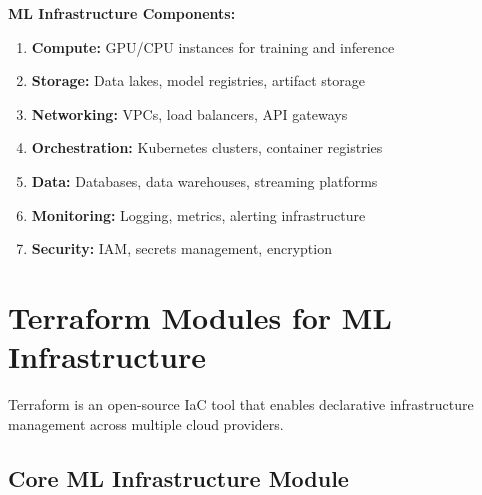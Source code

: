 \textbf{ML Infrastructure Components:}

\begin{enumerate}
    \item \textbf{Compute:} GPU/CPU instances for training and inference
    \item \textbf{Storage:} Data lakes, model registries, artifact storage
    \item \textbf{Networking:} VPCs, load balancers, API gateways
    \item \textbf{Orchestration:} Kubernetes clusters, container registries
    \item \textbf{Data:} Databases, data warehouses, streaming platforms
    \item \textbf{Monitoring:} Logging, metrics, alerting infrastructure
    \item \textbf{Security:} IAM, secrets management, encryption
\end{enumerate}

\section{Terraform Modules for ML Infrastructure}

Terraform is an open-source IaC tool that enables declarative infrastructure management across multiple cloud providers.

\subsection{Core ML Infrastructure Module}

